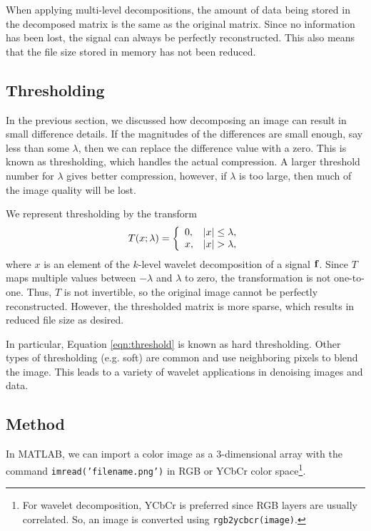 \documentclass[12pt]{article}
\theoremstyle{definition}
\renewenvironment{cases}{
  \left\{
    \begin{array}{ll}
}{
    \end{array}
  \right.
}
\begin{document}
  When applying multi-level decompositions, the amount of data being stored in the decomposed matrix is the same as the original matrix. Since no information has been lost, the signal can always be perfectly reconstructed. This also means that the file size stored in memory has not been reduced.
  
  \subsection{Thresholding}
  In the previous section, we discussed how decomposing an image can result in small difference details. If the magnitudes of the differences are small enough, say less than some \(\lambda\), then we can replace the difference value with a zero. This is known as thresholding, which handles the actual compression. A larger threshold number for \(\lambda\) gives better compression, however, if \(\lambda\) is too large, then much of the image quality will be lost.

  We represent thresholding by the transform
  \begin{equation} \label{eqn:threshold}
    T(x;\lambda) = \begin{cases}
      0, & |x| \leq \lambda,\\
      x, & |x| > \lambda,
    \end{cases}
  \end{equation}
  where \(x\) is an element of the \(k\)-level wavelet decomposition of a signal \(\vb{f}\). Since \(T\) maps multiple values between \(-\lambda\) and \(\lambda\) to zero, the transformation is not one-to-one. Thus, \(T\) is not invertible, so the original image cannot be perfectly reconstructed. However, the thresholded matrix is more sparse, which results in reduced file size as desired.

  In particular, Equation \eqref{eqn:threshold} is known as hard thresholding. Other types of thresholding (e.g. soft) are common and use neighboring pixels to blend the image. This leads to a variety of wavelet applications in denoising images and data.

  \subsection{Method}
  In MATLAB, we can import a color image as a 3-dimensional array with the command \texttt{imread('filename.png')} in RGB or YCbCr color space\footnote{For wavelet decomposition, YCbCr is preferred since RGB layers are usually correlated. So, an image is converted using \texttt{rgb2ycbcr(image)}.}.
  
\end{document}

